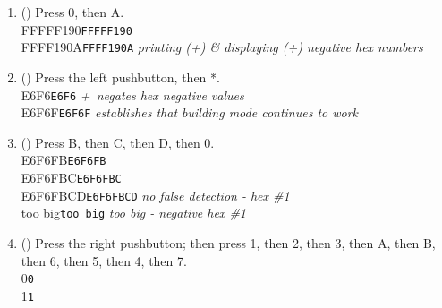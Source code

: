 \begin{enumerate}
    {\dviiseg FFFFFF19}\hspace{1cm}\texttt{FFFFFF19}\hspace{1cm}
    \textit{+\textonehalf\ negates hex positive values}
\item(\phantom{xxx}) Press 0, then A. \\
    {\dviiseg FFFFF190}\hspace{1cm}\texttt{FFFFF190} \\
    {\dviiseg FFFF190A}\hspace{1cm}\texttt{FFFF190A}\hspace{1cm}
    \textit{printing (+\textonehalf) \& displaying (+\textonehalf) negative hex
    numbers}
\item(\phantom{xxx}) Press the left pushbutton, then *. \\
    {\dviiseg \phantom{0000}E6F6}\hspace{1cm}\texttt{E6F6}\hspace{1cm}
    \textit{+\textonehalf\ negates hex negative values} \\
    {\dviiseg \phantom{000}E6F6F}\hspace{1cm}\texttt{E6F6F}\hspace{1cm}
    \textit{establishes that building mode continues to work}
\item(\phantom{xxx}) Press B, then C, then D, then 0. \\
    {\dviiseg \phantom{00}E6F6FB}\hspace{1cm}\texttt{E6F6FB} \\
    {\dviiseg \phantom{0}E6F6FBC}\hspace{1cm}\texttt{E6F6FBC} \\
    {\dviiseg           E6F6FBCD}\hspace{1cm}\texttt{E6F6FBCD}\hspace{1cm}
    \textit{no false detection - hex \#1} \\
    {\dviiseg \phantom{0}too big}\hspace{1cm}\texttt{too big}\hspace{1cm}
    \textit{too big - negative hex \#1}
\item (\phantom{xxx}) Press the right pushbutton; then press 1, then 2, then 3, then A, then B, then 6, then 5, then 4, then 7. \\
    {\dviiseg \phantom{0000000}0}\hspace{1cm}\texttt{0} \\
    {\dviiseg \phantom{0000000}1}\hspace{1cm}\texttt{1} \\

\end{enumerate}

